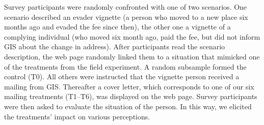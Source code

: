 \documentclass[prod,jeeabib]{jeea}
\begin{document}
Survey participants were randomly confronted with one of two scenarios. One scenario described an evader vignette (a person who moved to a new place six months ago  and evaded the fee since then), the other one a vignette of a complying individual (who moved six month ago, paid the fee, but did not inform GIS about the change in address). After participants read the scenario description, the web page randomly linked them to a situation that mimicked one of the treatments from the field experiment. A random subsample formed the control (T0). All others were instructed that the vignette person received a mailing from GIS. Thereafter a cover letter, which corresponds to one of our six mailing treatments (T1--T6), was displayed on the web page. Survey participants were then asked to evaluate the situation of the person. In this way, we elicited the treatments' impact on various perceptions.
\end{document}
